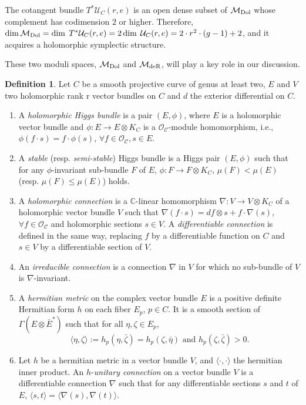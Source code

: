 \documentclass[oneside, 11pt]{amsart}
\theoremstyle{definition}
\newtheorem{Def}[thm]{Definition}
\numberwithin{equation}{subsection}
\def\tensor{\otimes}
\def\Dol{{\text{\rm{Dol}}}}
\def\deR{{\text{\rm{deR}}}}
\newcommand{\cU}{{\mathcal{U}}}
\newcommand{\la}{{\langle}}
\newcommand{\ra}{{\rangle}}
\begin{document}
The cotangent bundle $T^{*}\cU_{C}(r,e)$ is an open dense subset of $\mathcal{M}_{\Dol}$ whose complement has codimension $2$ or higher. Therefore, $\dim \mathcal{M}_{\Dol}= \dim\; T^{*}\cU_{C}(r,e)=2 \dim\; \cU_{C}(r,e)= 2\cdot r^2 \cdot (g-1)+2$,
and it acquires a holomorphic symplectic structure.

These two moduli spaces, $\mathcal{M}_{\Dol}$ and $\mathcal{M}_{\deR}$, will play a key role in our discussion.


\begin{Def}\label{Higgs def}
Let $C$ be a smooth projective curve of genus at least two, $E$ and $V$  two holomorphic rank r vector bundles on $C$ and $d$ the exterior differential on $C$.
\begin{enumerate} 
\item A \textit{holomorphic Higgs bundle} is a pair $(E, \phi)$, where $E$ is a holomorphic vector bundle and $\phi:E\stackrel{}{\rightarrow}E\otimes K_C$ is a $\mathcal{O_C}$-module homomorphism, i.e., $\phi(f \cdot s)=f \cdot \phi(s)$, $\forall f\in \mathcal{O_C}, s\in E$.
\item A \textit{stable}  (resp. \emph{semi-stable})
Higgs bundle is a Higgs pair $(E, \phi)$ such that for any $\phi$-invariant sub-bundle $F$ of $E$, $\phi:F\stackrel{}{\rightarrow}F\otimes K_C$,  $\mu(F)<\mu(E)$ (resp. $\mu(F)\leq \mu(E)$) holds.
\item A  \textit{holomorphic connection} is a 
$\mathbb{C}$-linear homomorphism  $\nabla: V\stackrel{}{\rightarrow}V\otimes K_C$ 
of a holomorphic vector bundle $V$  such that 
$\nabla(f \cdot s)=df\tensor  s+f\cdot \nabla(s)$, $\forall f\in \mathcal{O_C}$ and holomorphic 
sections $s\in V$. A \emph{differentiable connection}
is defined in the same way, replacing $f$
by a differentiable function on $C$ and $s\in V$ 
by a differentiable section of $V$.
\item An \textit{irreducible connection} is a connection $\nabla$ in $V$ for which no sub-bundle of $V$  is $\nabla$-invariant.
\item A \textit{hermitian metric} on the complex vector bundle $E$
is a positive definite Hermitian form $h$
on each fiber $E_p$, $p\in C$. It is a smooth section of $\Gamma(E\otimes \bar{E}^*)$ such that for all $\eta, \zeta\in E_{p}$,
$$\la \eta,\zeta\ra:= h_{p}(\eta, \bar{\zeta})=h_{p}(\zeta, \bar{\eta}) \text{ and } h_p(\zeta, \bar{\zeta})>0.$$
\item Let $h$ be a hermitian 
metric in a vector bundle $V$, and 
$\la\cdot,\cdot\ra$ the hermitian inner 
product. An $h$-\textit{unitary connection} on a 
 vector bundle $V$ is a 
 differentiable 
connection $\nabla$ such that for any 
differentiable sections $s$ and $t$ of $E$,   $\la s,t\ra=\la \nabla(s),\nabla(t)\ra$.
\end{enumerate}
\end{Def}
\end{document}
